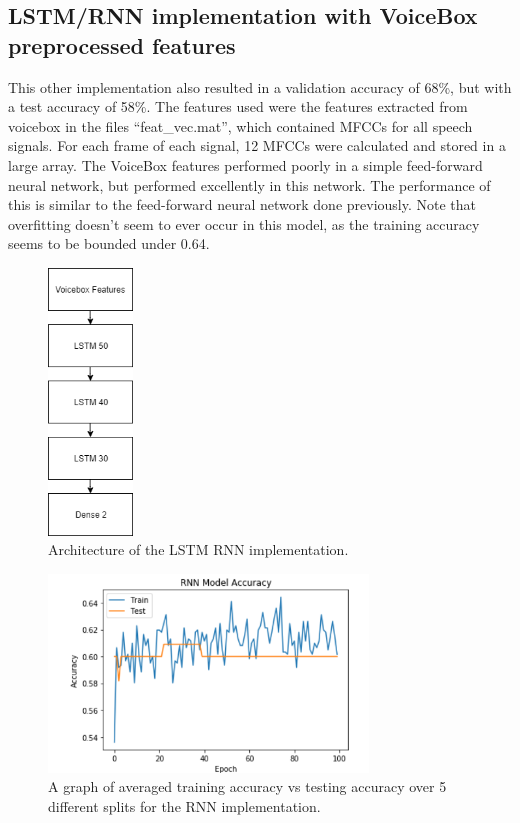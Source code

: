 \documentclass{article}
\begin{document}
\subsection{LSTM/RNN implementation with VoiceBox preprocessed features}
\label{subsec:rnn}

This other implementation also resulted in a validation accuracy of 68\%, but with a test accuracy of 58\%.
The features used were the features extracted from voicebox in the files “feat\_vec.mat”, which contained MFCCs for all speech signals.
For each frame of each signal, 12 MFCCs were calculated and stored in a large array.
The VoiceBox features performed poorly in a simple feed-forward neural network, but performed excellently in this network.
The performance of this is similar to the feed-forward neural network done previously.
Note that overfitting doesn’t seem to ever occur in this model, as the training accuracy seems to be bounded under 0.64.

\begin{figure}[htb]
	\centering
	\includegraphics[width = 2.25cm]{figs/rnn_architecture}
	\caption{Architecture of the LSTM RNN implementation.}
	\label{fig:rnn_architecture}
\end{figure}

\begin{figure}[htb]
	\centering
	\includegraphics[width = 8.5cm]{figs/rnn_graph}
	\caption{A graph of averaged training accuracy vs testing accuracy over 5 different splits for the RNN implementation.}
	\label{fig:rnn_graph}
\end{figure}
\end{document}
